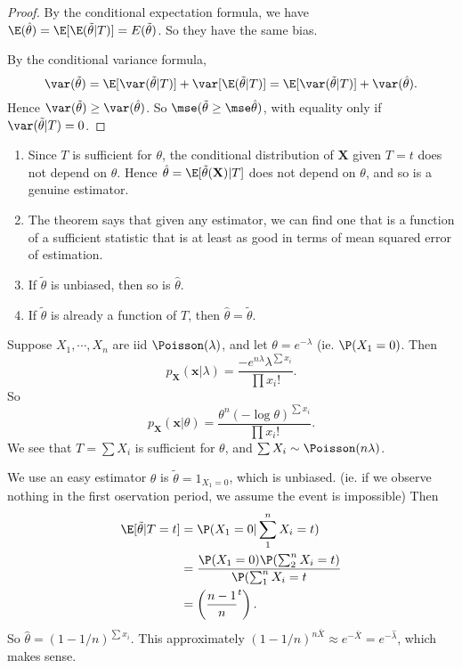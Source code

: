 \documentclass[a4paper]{article}
\begin{document}
\begin{proof}
  By the conditional expectation formula, we have $\E(\hat{\theta}) = \E[\E(\tilde{\theta}|T)] = E(\tilde{\theta})$. So they have the same bias.

  By the conditional variance formula,
  \[
    \var(\tilde{\theta}) = \E[\var (\tilde{\theta}|T)] + \var [\E(\tilde{\theta}|T)] = \E[\var(\tilde{\theta}|T)] + \var(\hat{\theta}).
  \]
  Hence $\var(\tilde{\theta}) \geq \var (\hat{\theta})$. So $\mse(\tilde{\theta} \geq \mse\hat{\theta})$, with equality only if $\var(\tilde{\theta}|T) = 0$.
\end{proof}
\note
\begin{enumerate}
  \item Since $T$ is sufficient for $\theta$, the conditional distribution of $\mathbf{X}$ given $T = t$ does not depend on $\theta$. Hence $\hat{\theta} = \E[\tilde{\theta}(\mathbf{X})|T]$ does not depend on $\theta$, and so is a genuine estimator.
  \item The theorem says that given any estimator, we can find one that is a function of a sufficient statistic that is at least as good in terms of mean squared error of estimation.
  \item If $\tilde{\theta}$ is unbiased, then so is $\hat{\theta}$.
  \item If $\tilde{\theta}$ is already a function of $T$, then $\hat{\theta} = \tilde{\theta}$.
\end{enumerate}

\begin{eg}
  Suppose $X_1, \cdots, X_n$ are iid $\Poisson(\lambda)$, and let $\theta = e^{-\lambda}$ (ie. $\P(X_1 = 0)$. Then
  \[
    p_\mathbf{X}(\mathbf{x}|\lambda) =\frac{-e^{n\lambda}\lambda^{\sum x_i}}{\prod x_i!}.
  \]
  So
  \[
    p_\mathbf{X}(\mathbf{x}|\theta) = \frac{\theta^n(-\log \theta)^{\sum x_i}}{\prod x_i!}.
  \]
  We see that $T = \sum X_i$ is sufficient for $\theta$, and $\sum X_i \sim \Poisson (n\lambda)$.

  We use an easy estimator $\theta$ is $\tilde{\theta} = 1_{X_1 = 0}$, which is unbiased. (ie. if we observe nothing in the first oservation period, we assume the event is impossible) Then
  \begin{align*}
    \E[\tilde{\theta}| T = t] &= \P(X_1 = 0|\sum_1^n X_i = t)\\
    &= \frac{\P(X_1 = 0)\P(\sum_2^n X_i = t)}{\P(\sum_1^n X_i = t}\\
    &= \left(\frac{n - 1}{n}^t\right).
  \end{align*}
  So $\hat{\theta} = (1 - 1/n)^{\sum x_i}$. This approximately $(1 - 1/n)^{n\bar{X}} \approx e^{-\bar X} = e^{-\hat{\lambda}}$, which makes sense.
\end{eg}
\end{document}
